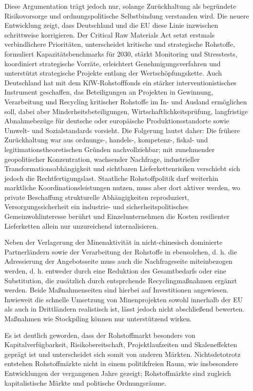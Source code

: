 \documentclass[12pt,a4paper,oneside]{book} %
\begin{document}
{Diese Argumentation trägt jedoch nur, solange Zurückhaltung als begründete Risikovorsorge und ordnungspolitische Selbstbindung verstanden wird. Die neuere Entwicklung zeigt, dass Deutschland und die EU diese Linie inzwischen schrittweise korrigieren. Der Critical Raw Materials Act setzt erstmals verbindlichere Prioritäten, unterscheidet kritische und strategische Rohstoffe, formuliert Kapazitätsbenchmarks für 2030, stärkt Monitoring und Stresstests, koordiniert strategische Vorräte, erleichtert Genehmigungsverfahren und unterstützt strategische Projekte entlang der Wertschöpfungskette. Auch Deutschland hat mit dem KfW-Rohstofffonds ein stärker interventionistisches Instrument geschaffen, das Beteiligungen an Projekten in Gewinnung, Verarbeitung und Recycling kritischer Rohstoffe im In- und Ausland ermöglichen soll, dabei aber Minderheitsbeteiligungen, Wirtschaftlichkeitsprüfung, langfristige Abnahmebezüge für deutsche oder europäische Produktionsstandorte sowie Umwelt- und Sozialstandards vorsieht. Die Folgerung lautet daher: Die frühere Zurückhaltung war aus ordnungs-, handels-, kompetenz-, fiskal- und legitimationstheoretischen Gründen nachvollziehbar; mit zunehmender geopolitischer Konzentration, wachsender Nachfrage, industrieller Transformationsabhängigkeit und sichtbaren Lieferkettenrisiken verschiebt sich jedoch die Rechtfertigungslast. Staatliche Rohstoffpolitik darf weiterhin marktliche Koordinationsleistungen nutzen, muss aber dort aktiver werden, wo private Beschaffung strukturelle Abhängigkeiten reproduziert, Versorgungssicherheit ein industrie- und sicherheitspolitisches Gemeinwohlinteresse berührt und Einzelunternehmen die Kosten resilienter Lieferketten allein nur unzureichend internalisieren.

Neben der Verlagerung der Minenaktivität in nicht-chinesisch dominierte Partnerländern sowie der Verarbeitung der Rohstoffe in ebensolchen, d. h. die Adressierung der Angebotsseite muss auch die Nachfrageseite miteinbezogen werden, d. h. entweder durch eine Reduktion des Gesamtbedarfs oder eine Substitution, die zusätzlich durch entsprchende Recyclingmaßnahmen ergänzt werden. Beide Maßnahmenseiten sind hierbei auf Investitionen angewiesen. Inwieweit die schnelle Umsetzung von Minenprojekten sowohl innerhalb der EU als auch in Drittländern realistisch ist, lässt jedoch nicht abschließend bewerten. Maßnahmen wie Stockpiling können nur unterstützend wirken.

Es ist deutlich geworden, dass der Rohstoffmarkt besonders von Kapitalverfügbarkeit, Risikobereitschaft, Projektlaufzeiten und Skaleneffekten geprägt ist und unterscheidet sich somit von anderen Märkten. Nichtsdetotrotz entstehen Rohstoffmärkte nicht in einem politikfreien Raum, wie insbesondere Entwicklungen der vergangenen Jahre gezeigt; Rohstoffmärkte sind zugleich kapitalistische Märkte und politische Ordnungsräume.

}
\end{document}
